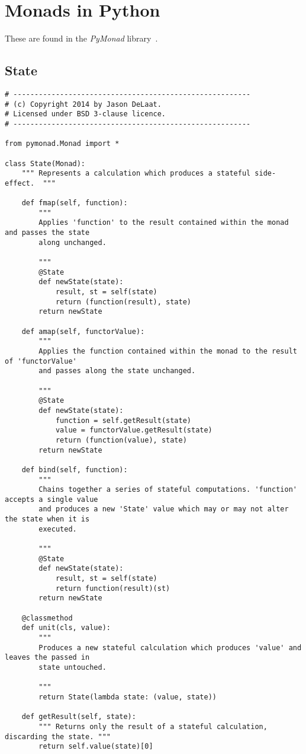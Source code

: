 \chapter{Monads in Python}\label{app:monadspython}
These are found in the \emph{PyMonad} library~\cite{https://bitbucket.org/jason_delaat/pymonad/src/cbecd6796cd1488237d2a0f057cefd2a50df753a/pymonad/State.py?at=master&fileviewer=file-view-default}.

\section{State}
\begin{lstlisting}
# --------------------------------------------------------
# (c) Copyright 2014 by Jason DeLaat.
# Licensed under BSD 3-clause licence.
# --------------------------------------------------------

from pymonad.Monad import *

class State(Monad):
	""" Represents a calculation which produces a stateful side-effect.  """

	def fmap(self, function):
		"""
		Applies 'function' to the result contained within the monad and passes the state
		along unchanged.

		"""
		@State
		def newState(state):
			result, st = self(state)
			return (function(result), state)
		return newState

	def amap(self, functorValue):
		"""
		Applies the function contained within the monad to the result of 'functorValue'
		and passes along the state unchanged.

		"""
		@State
		def newState(state):
			function = self.getResult(state)
			value = functorValue.getResult(state)
			return (function(value), state)
		return newState

	def bind(self, function):
		"""
		Chains together a series of stateful computations. 'function' accepts a single value
		and produces a new 'State' value which may or may not alter the state when it is
		executed.

		"""
		@State
		def newState(state):
			result, st = self(state)
			return function(result)(st)
		return newState

	@classmethod
	def unit(cls, value):
		"""
		Produces a new stateful calculation which produces 'value' and leaves the passed in
		state untouched.

		"""
		return State(lambda state: (value, state))

	def getResult(self, state):
		""" Returns only the result of a stateful calculation, discarding the state. """
		return self.value(state)[0]


\end{lstlisting}
